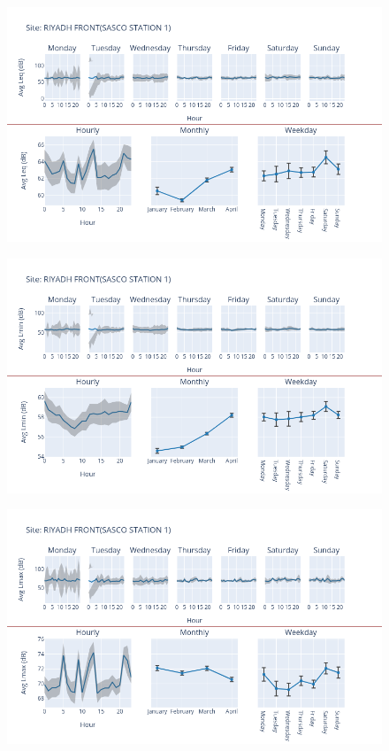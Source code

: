 \documentclass[12pt, oneside]{book}
\begin{document}
{ 
{\begin{figure}[H] 
 \centering 
\includegraphics[width=.88\textwidth, keepaspectratio]{image131} 
 \end{figure}}{} 

{\begin{figure}[H] 
 \centering 
\includegraphics[width=.88\textwidth, keepaspectratio]{image132} 
 \end{figure}}{} 

{\begin{figure}[H] 
 \centering 
\includegraphics[width=.88\textwidth, keepaspectratio]{image133} 
 \end{figure}}{} 


}
\end{document}
